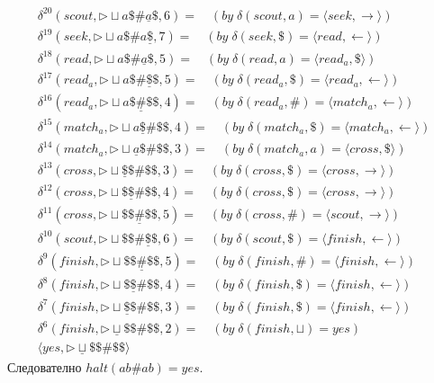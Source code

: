 \documentclass[14pt]{extarticle}
\begin{document}
\begin{align*}
    \delta^{20}(scout, \triangleright \sqcup a\$ \# \underline{a}\$, 6) = \quad (by \; \delta(scout, a) = \langle seek, \rightarrow \rangle) \\
    \delta^{19}(seek, \triangleright \sqcup a\$ \# a\underline{\$}, 7) = \quad (by \; \delta(seek, \$) = \langle read, \leftarrow \rangle) \\
    \delta^{18}(read, \triangleright \sqcup a\$ \# \underline{a}\$, 5) = \quad (by \; \delta(read, a) = \langle read_a, \$ \rangle) \\
    \delta^{17}(read_a, \triangleright \sqcup a\$ \# \underline{\$}\$, 5) = \quad (by \; \delta(read_a, \$) = \langle read_a, \leftarrow \rangle) \\
    \delta^{16}(read_a, \triangleright \sqcup a\$ \underline{\#} \$\$, 4) = \quad (by \; \delta(read_a, \#) = \langle match_a, \leftarrow \rangle) \\
    \delta^{15}(match_a, \triangleright \sqcup a \underline{\$} \# \$\$, 4) = \quad (by \; \delta(match_a, \$) = \langle match_a, \leftarrow \rangle) \\
    \delta^{14}(match_a, \triangleright \sqcup \underline{a} \$ \# \$\$, 3) = \quad (by \; \delta(match_a, a) = \langle cross, \$ \rangle) \\
    \delta^{13}(cross, \triangleright \sqcup \underline{\$} \$ \# \$\$, 3) = \quad (by \; \delta(cross, \$) = \langle cross, \rightarrow \rangle) \\
    \delta^{12}(cross, \triangleright \sqcup \$ \underline{\$} \# \$\$, 4) = \quad (by \; \delta(cross, \$) = \langle cross, \rightarrow \rangle) \\
    \delta^{11}(cross, \triangleright \sqcup \$\$ \underline{\#} \$\$, 5) = \quad (by \; \delta(cross, \#) = \langle scout, \rightarrow \rangle) \\
    \delta^{10}(scout, \triangleright \sqcup \$\$ \# \underline{\$} \$, 6) = \quad (by \; \delta(scout, \$) = \langle finish, \leftarrow \rangle) \\
    \delta^{9}(finish, \triangleright \sqcup \$\$ \underline{\#} \$\$, 5) = \quad (by \; \delta(finish, \#) = \langle finish, \leftarrow \rangle) \\
    \delta^{8}(finish, \triangleright \sqcup \$ \underline{\$} \# \$\$, 4) = \quad (by \; \delta(finish, \$) = \langle finish, \leftarrow \rangle) \\
    \delta^{7}(finish, \triangleright \sqcup \underline{\$}\$ \# \$\$, 3) = \quad (by \; \delta(finish, \$) = \langle finish, \leftarrow \rangle) \\
    \delta^{6}(finish, \triangleright \underline{\sqcup} \$\$ \# \$\$, 2) = \quad (by \; \delta(finish, \sqcup) = yes) \\
    \langle yes, \triangleright \underline{\sqcup} \$\$ \# \$\$ \rangle
\end{align*}
Следователно \(halt(ab\#ab) = yes\).
\end{document}
